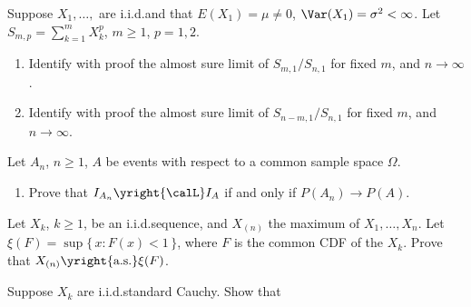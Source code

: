 \begin{problem}[DasGupta 7.4 (a), (b)]
  Suppose \(X_1,\dotsc,\) are i.i.d.\@ and that \(E(X_1)=\mu\neq 0\),
  \(\Var(X_1)=\sigma^2<\infty\). Let \(S_{m,p}=\sum_{k=1}^m X_k^p\),
  \(m\geq 1\), \(p=1,2\).
  \begin{enumerate}[label=(\alph*),noitemsep]
  \item Identify with proof the almost sure limit of \(S_{m,1}/S_{n,1}\)
    for fixed \(m\), and \(n\to\infty\).
  \item Identify with proof the almost sure limit of \(S_{n-m,1}/S_{n,1}\)
    for fixed \(m\), and \(n\to\infty\).
  \end{enumerate}
\end{problem}
\begin{solution}

\end{solution}
\newpage

\begin{problem}[DasGupta 7.5 (a)]
  Let \(A_n\), \(n\geq 1\), \(A\) be events with respect to a common sample
  space \(\Omega\).
  \begin{enumerate}[label=(\alph*),noitemsep]
  \item Prove that \(I_{A_n}\yright{\calL} I_A\) if and only if \(P(A_n)\to
    P(A)\).
  \end{enumerate}
\end{problem}
\begin{solution}

\end{solution}
\newpage

\begin{problem}
  Let \(X_k\), \(k\geq 1\), be an i.i.d.\@ sequence, and \(X_{(n)}\) the
  maximum of \(X_1,\dotsc,X_n\). Let \(\xi(F)=\sup\{\,x:F(x)<1\,\}\), where
  \(F\) is the common CDF of the \(X_k\). Prove that
  \(X_{(n)}\yright{\text{a.s.}}\xi(F)\).
\end{problem}
\begin{solution}

\end{solution}
\newpage

\begin{problem}[DasGupta 7.14 (a)]
  Suppose \(X_k\) are i.i.d.\@ standard Cauchy. Show that
\end{problem}
\begin{solution}

\end{solution}
\newpage

